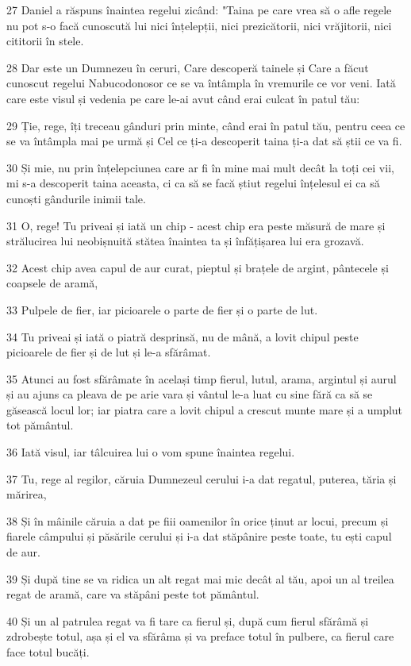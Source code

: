 \par 27 Daniel a răspuns înaintea regelui zicând: "Taina pe care vrea să o afle regele nu pot s-o facă cunoscută lui nici înțelepții, nici prezicătorii, nici vrăjitorii, nici cititorii în stele.
\par 28 Dar este un Dumnezeu în ceruri, Care descoperă tainele și Care a făcut cunoscut regelui Nabucodonosor ce se va întâmpla în vremurile ce vor veni. Iată care este visul și vedenia pe care le-ai avut când erai culcat în patul tău:
\par 29 Ție, rege, îți treceau gânduri prin minte, când erai în patul tău, pentru ceea ce se va întâmpla mai pe urmă și Cel ce ți-a descoperit taina ți-a dat să știi ce va fi.
\par 30 Și mie, nu prin înțelepciunea care ar fi în mine mai mult decât la toți cei vii, mi s-a descoperit taina aceasta, ci ca să se facă știut regelui înțelesul ei ca să cunoști gândurile inimii tale.
\par 31 O, rege! Tu priveai și iată un chip - acest chip era peste măsură de mare și strălucirea lui neobișnuită stătea înaintea ta și înfățișarea lui era grozavă.
\par 32 Acest chip avea capul de aur curat, pieptul și brațele de argint, pântecele și coapsele de aramă,
\par 33 Pulpele de fier, iar picioarele o parte de fier și o parte de lut.
\par 34 Tu priveai și iată o piatră desprinsă, nu de mână, a lovit chipul peste picioarele de fier și de lut și le-a sfărâmat.
\par 35 Atunci au fost sfărâmate în același timp fierul, lutul, arama, argintul și aurul și au ajuns ca pleava de pe arie vara și vântul le-a luat cu sine fără ca să se găsească locul lor; iar piatra care a lovit chipul a crescut munte mare și a umplut tot pământul.
\par 36 Iată visul, iar tâlcuirea lui o vom spune înaintea regelui.
\par 37 Tu, rege al regilor, căruia Dumnezeul cerului i-a dat regatul, puterea, tăria și mărirea,
\par 38 Și în mâinile căruia a dat pe fiii oamenilor în orice ținut ar locui, precum și fiarele câmpului și păsările cerului și i-a dat stăpânire peste toate, tu ești capul de aur.
\par 39 Și după tine se va ridica un alt regat mai mic decât al tău, apoi un al treilea regat de aramă, care va stăpâni peste tot pământul.
\par 40 Și un al patrulea regat va fi tare ca fierul și, după cum fierul sfărâmă și zdrobește totul, așa și el va sfărâma și va preface totul în pulbere, ca fierul care face totul bucăți.
